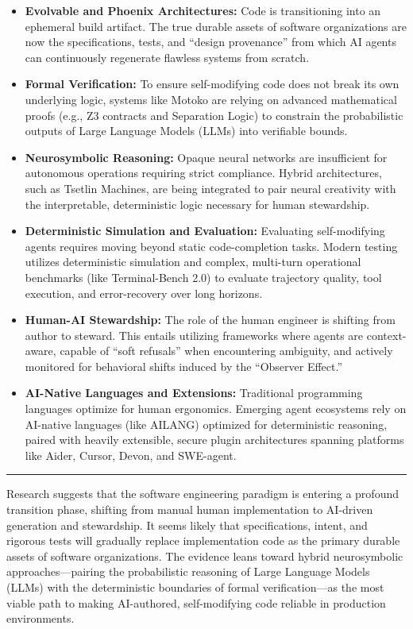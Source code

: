 \documentclass[
  11pt,
]{article}
\providecommand{\tightlist}{%
  \setlength{\itemsep}{0pt}\setlength{\parskip}{0pt}}
\begin{document}
\begin{itemize}
\tightlist
\item
  \textbf{Evolvable and Phoenix Architectures:} Code is transitioning
  into an ephemeral build artifact. The true durable assets of software
  organizations are now the specifications, tests, and ``design
  provenance'' from which AI agents can continuously regenerate flawless
  systems from scratch.
\item
  \textbf{Formal Verification:} To ensure self-modifying code does not
  break its own underlying logic, systems like Motoko are relying on
  advanced mathematical proofs (e.g., Z3 contracts and Separation Logic)
  to constrain the probabilistic outputs of Large Language Models (LLMs)
  into verifiable bounds.
\item
  \textbf{Neurosymbolic Reasoning:} Opaque neural networks are
  insufficient for autonomous operations requiring strict compliance.
  Hybrid architectures, such as Tsetlin Machines, are being integrated
  to pair neural creativity with the interpretable, deterministic logic
  necessary for human stewardship.
\item
  \textbf{Deterministic Simulation and Evaluation:} Evaluating
  self-modifying agents requires moving beyond static code-completion
  tasks. Modern testing utilizes deterministic simulation and complex,
  multi-turn operational benchmarks (like Terminal-Bench 2.0) to
  evaluate trajectory quality, tool execution, and error-recovery over
  long horizons.
\item
  \textbf{Human-AI Stewardship:} The role of the human engineer is
  shifting from author to steward. This entails utilizing frameworks
  where agents are context-aware, capable of ``soft refusals'' when
  encountering ambiguity, and actively monitored for behavioral shifts
  induced by the ``Observer Effect.''
\item
  \textbf{AI-Native Languages and Extensions:} Traditional programming
  languages optimize for human ergonomics. Emerging agent ecosystems
  rely on AI-native languages (like AILANG) optimized for deterministic
  reasoning, paired with heavily extensible, secure plugin architectures
  spanning platforms like Aider, Cursor, Devon, and SWE-agent.
\end{itemize}

\begin{center}\rule{0.5\linewidth}{0.5pt}\end{center}

Research suggests that the software engineering paradigm is entering a
profound transition phase, shifting from manual human implementation to
AI-driven generation and stewardship. It seems likely that
specifications, intent, and rigorous tests will gradually replace
implementation code as the primary durable assets of software
organizations. The evidence leans toward hybrid neurosymbolic
approaches---pairing the probabilistic reasoning of Large Language
Models (LLMs) with the deterministic boundaries of formal
verification---as the most viable path to making AI-authored,
self-modifying code reliable in production environments.
\end{document}
